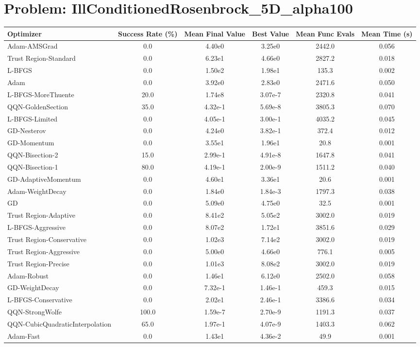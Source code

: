 \documentclass{article}
\begin{document}
\section{Problem: IllConditionedRosenbrock\_5D\_alpha100}
\begin{longtable}{p{3cm}*{5}{c}}
\toprule
\textbf{Optimizer} & \textbf{Success Rate (\%)} & \textbf{Mean Final Value} & \textbf{Best Value} & \textbf{Mean Func Evals} & \textbf{Mean Time (s)} \\
\midrule
Adam-AMSGrad & 0.0 & 4.40e0 & 3.25e0 & 2442.0 & 0.056 \\
Trust Region-Standard & 0.0 & 6.23e1 & 4.66e0 & 2827.2 & 0.018 \\
L-BFGS & 0.0 & 1.50e2 & 1.98e1 & 135.3 & 0.002 \\
Adam & 0.0 & 3.92e0 & 2.83e0 & 2471.6 & 0.050 \\
L-BFGS-MoreThuente & 20.0 & 1.74e8 & 3.07e-7 & 2320.8 & 0.041 \\
QQN-GoldenSection & 35.0 & 4.32e-1 & 5.69e-8 & 3805.3 & 0.070 \\
L-BFGS-Limited & 0.0 & 4.05e-1 & 3.00e-1 & 4035.2 & 0.045 \\
GD-Nesterov & 0.0 & 4.24e0 & 3.82e-1 & 372.4 & 0.012 \\
GD-Momentum & 0.0 & 3.55e1 & 1.96e1 & 20.8 & 0.001 \\
QQN-Bisection-2 & 15.0 & 2.99e-1 & 4.91e-8 & 1647.8 & 0.041 \\
QQN-Bisection-1 & 80.0 & 4.19e-1 & 2.00e-9 & 1511.2 & 0.040 \\
GD-AdaptiveMomentum & 0.0 & 4.60e1 & 3.36e1 & 20.6 & 0.001 \\
Adam-WeightDecay & 0.0 & 1.84e0 & 1.84e-3 & 1797.3 & 0.038 \\
GD & 0.0 & 5.09e0 & 4.75e0 & 32.5 & 0.001 \\
Trust Region-Adaptive & 0.0 & 8.41e2 & 5.05e2 & 3002.0 & 0.019 \\
L-BFGS-Aggressive & 0.0 & 8.07e2 & 1.72e1 & 3851.6 & 0.029 \\
Trust Region-Conservative & 0.0 & 1.02e3 & 7.14e2 & 3002.0 & 0.019 \\
Trust Region-Aggressive & 0.0 & 5.00e0 & 4.66e0 & 776.1 & 0.005 \\
Trust Region-Precise & 0.0 & 1.01e3 & 8.08e2 & 3002.0 & 0.019 \\
Adam-Robust & 0.0 & 1.46e1 & 6.12e0 & 2502.0 & 0.058 \\
GD-WeightDecay & 0.0 & 7.32e-1 & 1.46e-1 & 459.3 & 0.015 \\
L-BFGS-Conservative & 0.0 & 2.02e1 & 2.46e-1 & 3386.6 & 0.034 \\
QQN-StrongWolfe & 100.0 & 1.59e-7 & 2.70e-9 & 1191.3 & 0.037 \\
QQN-CubicQuadraticInterpolation & 65.0 & 1.97e-1 & 4.07e-9 & 1403.3 & 0.062 \\
Adam-Fast & 0.0 & 1.43e1 & 4.36e-2 & 49.9 & 0.001 \\
\bottomrule
\end{longtable}
\end{document}
